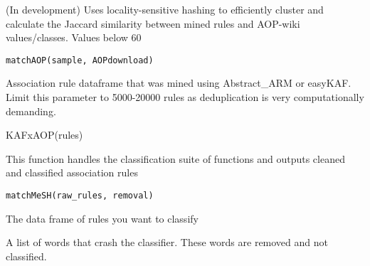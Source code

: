 \documentclass[a4paper]{book}
\begin{document}
%
\begin{Description}\relax
(In development) Uses locality-sensitive hashing to efficiently cluster and calculate the Jaccard similarity between mined rules and AOP-wiki values/classes. Values below 60
\end{Description}
%
\begin{Usage}
\begin{verbatim}
matchAOP(sample, AOPdownload)
\end{verbatim}
\end{Usage}
%
\begin{Arguments}
\begin{ldescription}
\item[\code{rules}] Association rule dataframe that was mined using Abstract\_ARM or easyKAF. Limit this parameter to 5000-20000 rules as deduplication is very computationally demanding.
\end{ldescription}
\end{Arguments}
%
\begin{Examples}
\begin{ExampleCode}
KAFxAOP(rules)
\end{ExampleCode}
\end{Examples}
%
\begin{Description}\relax
This function handles the classification suite of functions and outputs cleaned and classified association rules
\end{Description}
%
\begin{Usage}
\begin{verbatim}
matchMeSH(raw_rules, removal)
\end{verbatim}
\end{Usage}
%
\begin{Arguments}
\begin{ldescription}
\item[\code{raw\_rules}] The data frame of rules you want to classify

\item[\code{removal}] A list of words that crash the classifier. These words are removed and not classified.
\end{ldescription}
\end{Arguments}
\end{document}
